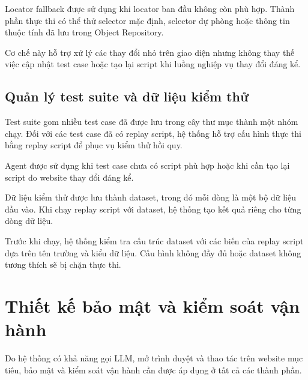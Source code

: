 Locator fallback được sử dụng khi locator ban đầu không còn phù hợp. Thành phần thực thi có thể thử selector mặc định, selector dự phòng hoặc thông tin thuộc tính đã lưu trong Object Repository.

Cơ chế này hỗ trợ xử lý các thay đổi nhỏ trên giao diện nhưng không thay thế việc cập nhật test case hoặc tạo lại script khi luồng nghiệp vụ thay đổi đáng kể.

\subsection{Quản lý test suite và dữ liệu kiểm thử}

Test suite gom nhiều test case đã được lưu trong cây thư mục thành một nhóm chạy. Đối với các test case đã có replay script, hệ thống hỗ trợ cấu hình thực thi bằng replay script để phục vụ kiểm thử hồi quy.

Agent được sử dụng khi test case chưa có script phù hợp hoặc khi cần tạo lại script do website thay đổi đáng kể.

Dữ liệu kiểm thử được lưu thành dataset, trong đó mỗi dòng là một bộ dữ liệu đầu vào. Khi chạy replay script với dataset, hệ thống tạo kết quả riêng cho từng dòng dữ liệu.

Trước khi chạy, hệ thống kiểm tra cấu trúc dataset với các biến của replay script dựa trên tên trường và kiểu dữ liệu. Cấu hình không đầy đủ hoặc dataset không tương thích sẽ bị chặn thực thi.

\section{Thiết kế bảo mật và kiểm soát vận hành}

Do hệ thống có khả năng gọi LLM, mở trình duyệt và thao tác trên website mục tiêu, bảo mật và kiểm soát vận hành cần được áp dụng ở tất cả các thành phần.

